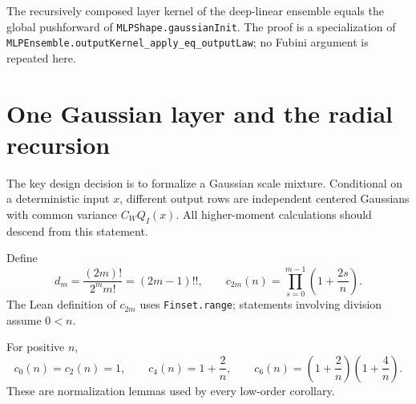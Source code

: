 \begin{lemma}
\label{lem:dln:kernelCompatibility}
The recursively composed layer kernel of the deep-linear ensemble equals the global pushforward of
\texttt{MLPShape.gaussianInit}.  The proof is a specialization of
\texttt{MLPEnsemble.outputKernel\_apply\_eq\_outputLaw}; no Fubini argument is repeated here.
\end{lemma}

\section{One Gaussian layer and the radial recursion}

The key design decision is to formalize a Gaussian scale mixture.  Conditional on a deterministic
input $x$, different output rows are independent centered Gaussians with common variance
$C_W Q_I(x)$.  All higher-moment calculations should descend from this statement.

\begin{definition}
\label{def:dln:momentFactors}
Define
\[
 d_m=\frac{(2m)!}{2^m m!}=(2m-1)!!,
 \qquad
 c_{2m}(n)=\prod_{s=0}^{m-1}\left(1+\frac{2s}{n}\right).
\]
The Lean definition of $c_{2m}$ uses \texttt{Finset.range}; statements involving division assume
$0<n$.
\end{definition}

\begin{lemma}
\label{lem:dln:smallFactors}
For positive $n$,
\[
 c_0(n)=c_2(n)=1,\qquad
 c_4(n)=1+\frac2n,\qquad
 c_6(n)=\left(1+\frac2n\right)\left(1+\frac4n\right).
\]
These are normalization lemmas used by every low-order corollary.
\end{lemma}

